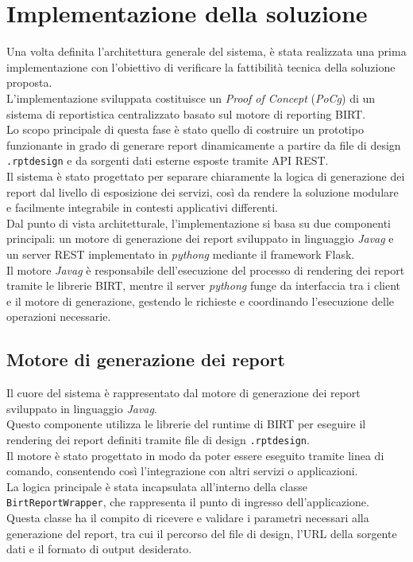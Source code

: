 \section{Implementazione della soluzione}
\label{sec:implementazione-soluzione}
Una volta definita l'architettura generale del sistema, è stata realizzata una prima implementazione con l'obiettivo di verificare la fattibilità tecnica della soluzione proposta. \\
L'implementazione sviluppata costituisce un \textit{Proof of Concept} (\emph{\gls{PoCg}}) di un sistema di reportistica centralizzato basato sul motore di reporting BIRT.\\
Lo scopo principale di questa fase è stato quello di costruire un prototipo funzionante in grado di generare report dinamicamente a partire da file di design \texttt{.rptdesign} e da sorgenti dati esterne esposte tramite API REST. \\
Il sistema è stato progettato per separare chiaramente la logica di generazione dei report dal livello di esposizione dei servizi, così da rendere la soluzione modulare e facilmente integrabile in contesti applicativi differenti.\\
Dal punto di vista architetturale, l'implementazione si basa su due componenti principali: un motore di generazione dei report sviluppato in linguaggio \emph{\gls{Javag}} e un server REST implementato in \emph{\gls{pythong}} mediante il framework Flask. \\
Il motore \emph{\gls{Javag}} è responsabile dell'esecuzione del processo di rendering dei report tramite le librerie BIRT, mentre il server \emph{\gls{pythong}} funge da interfaccia tra i client e il motore di generazione, gestendo le richieste e coordinando l'esecuzione delle operazioni necessarie.

\subsection{Motore di generazione dei report}

Il cuore del sistema è rappresentato dal motore di generazione dei report sviluppato in linguaggio \emph{\gls{Javag}}. \\
Questo componente utilizza le librerie del runtime di BIRT per eseguire il rendering dei report definiti tramite file di design \texttt{.rptdesign}. \\
Il motore è stato progettato in modo da poter essere eseguito tramite linea di comando, consentendo così l'integrazione con altri servizi o applicazioni.\\
La logica principale è stata incapsulata all'interno della classe \texttt{BirtReportWrapper}, che rappresenta il punto di ingresso dell'applicazione. \\
Questa classe ha il compito di ricevere e validare i parametri necessari alla generazione del report, tra cui il percorso del file di design, l'URL della sorgente dati e il formato di output desiderato.

